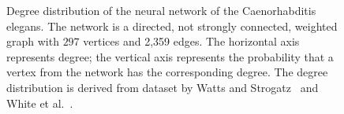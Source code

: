 \begin{figure}[!htbp]
\centering
{}
\qquad
{}
\caption{Degree distribution of the neural network of the
  Caenorhabditis elegans. The network is a directed, not strongly
  connected, weighted graph with $297$ vertices and 2,359 edges. The
  horizontal axis represents degree; the vertical axis represents the
  probability that a vertex from the network has the corresponding
  degree. The degree distribution is derived from dataset by Watts and
  Strogatz~\cite{WattsStrogatz1998} and White et
  al.~\cite{WhiteEtAl1986}.}
\label{fig:random_graphs:degree_distribution:neural_network_C_elegans}
\end{figure}

